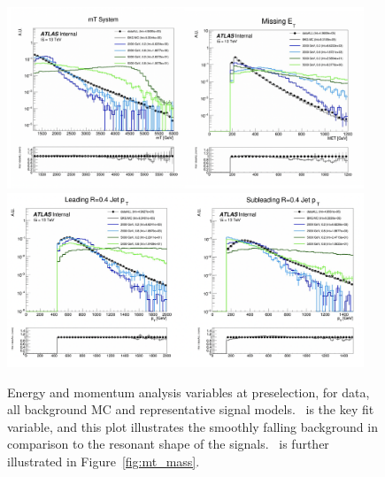 \begin{figure}[!htbp]
\centering
    \includegraphics[width=0.95\textwidth]{figures/eventsel/preselection/presel1}
    \includegraphics[width=0.95\textwidth]{figures/eventsel/preselection/presel2}
    \caption{Energy and momentum analysis variables at preselection, for data, all background MC and representative signal models. \mt~is the key fit variable, and this plot illustrates the smoothly falling background in comparison to the resonant shape of the signals. \mt~is further illustrated in Figure~\ref{fig:mt_mass}.
    \label{fig:presel_vars}}
\end{figure}

